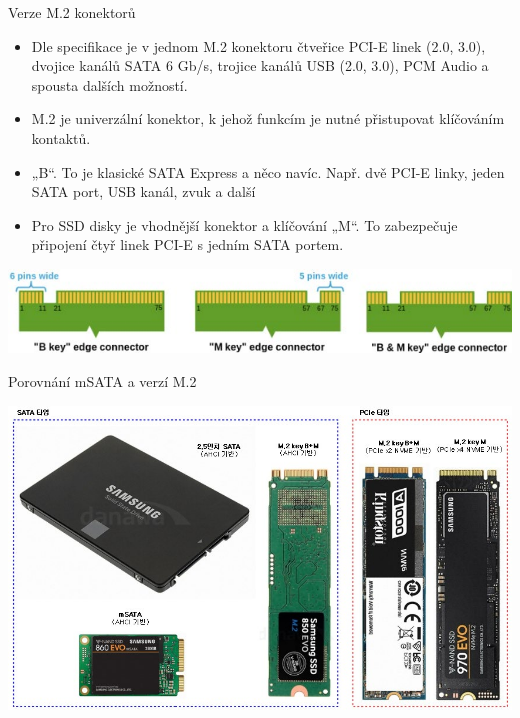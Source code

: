 \documentclass[aspectratio=43]{beamer}
\begin{document}
\begin{frame}{Verze M.2 konektorů}
	\begin{itemize}
		\item Dle specifikace je v jednom M.2 konektoru čtveřice PCI-E linek (2.0, 3.0), dvojice kanálů SATA 6 Gb/s, trojice kanálů USB (2.0, 3.0), PCM Audio a spousta dalších možností. 
		\item M.2 je univerzální konektor, k jehož funkcím je nutné přistupovat klíčováním kontaktů.
		\item „B“. To je klasické SATA Express a něco navíc. Např. dvě PCI-E linky, jeden SATA port, USB kanál, zvuk a další
		\item Pro SSD disky je vhodnější konektor a klíčování „M“. To zabezpečuje připojení čtyř linek PCI-E s jedním SATA portem.
	\end{itemize}
	
	
	\begin{center}
		\includegraphics[width=1\linewidth]{extrahovane_obrazky/img_2_page24_0.jpeg}
	\end{center}
	
\end{frame}


\begin{frame}{Porovnání mSATA a verzí M.2}
	 
	\begin{center}
		\includegraphics[width=1\linewidth]{extrahovane_obrazky/img_2_page26_0.jpeg}
	\end{center}
	
\end{frame}
\end{document}
